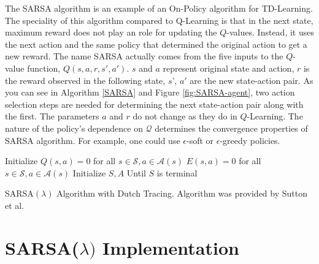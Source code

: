 \documentclass[10pt,conference]{IEEEtran}
\begin{document}
	The SARSA algorithm is an example of an On-Policy algorithm for TD-Learning\cite{sutton18}. The 
	speciality of this algorithm compared to Q-Learning is that in the next 
	state, maximum reward does not play an role for updating the \(Q\)-values. 
	Instead, it uses the next action and the same policy that determined the 
	original action to get a new reward. The name SARSA actually comes from the 
	five inputs to the \(Q\)-value function, \(Q(s, a, r, s', a')\). \(s\) and \(a\) represent original state 
	and action, \(r\) is the reward observed in the following state, \(s\)', \(a'\) are 
	the new state-action pair. As you can see in Algorithm \ref{SARSA} and Figure \ref{fig:SARSA-agent}, two 
	action selection steps are needed for determining the next state-action pair 
	along with the first. The parameters \(a\) and \(r\) do not change as they do in 
	\(Q\)-Learning. The nature of the policy's dependence on \(\mathcal{Q}\) determines 
	the convergence properties of SARSA algorithm. For example, one 
	could use \(\epsilon\)-soft or \(\epsilon\)-greedy policies. \cite{sutton18} 
	
	\begin{algorithm}
		\DontPrintSemicolon
		Initialize \(Q(s,a) = 0\) for all \(s \in \mathcal{S}, a \in \mathcal{A}(s)\)\;
		 {
			\(E(s, a) = 0\) for all \(s \in \mathcal{S}, a \in \mathcal{A}(s)\)\;
			Initialize \(S,A\)\;
			Until \(S\) is terminal\;
		}
		\caption{SARSA\((\lambda)\) Algorithm with Dutch Tracing.  Algorithm
		was provided by Sutton et al. \cite{sutton18}}
		\label{SARSA}
	\end{algorithm}

\section{SARSA(\(\lambda)\) Implementation}
\label{sec:implementation}
\end{document}
